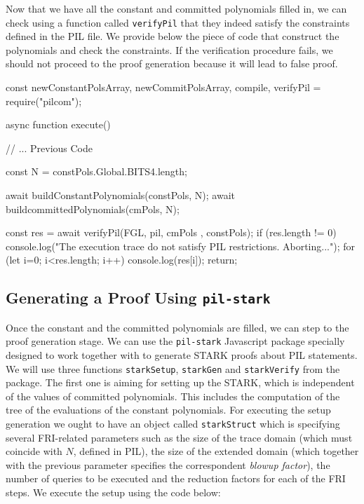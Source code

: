 Now that we have all the constant and committed polynomials filled in, we can check using a function called \texttt{verifyPil} that they indeed satisfy the constraints defined in the PIL file. We provide below the piece of code that construct the polynomials and check the constraints. If the verification procedure fails, we should not proceed to the proof generation because it will lead to false proof. 
\begin{js}
    const { newConstantPolsArray, newCommitPolsArray, compile, verifyPil } = require("pilcom");
    
    async function execute() {
        
        // ... Previous Code	
        
        const N = constPols.Global.BITS4.length;
        
        await buildConstantPolynomials(constPols, N);
        await buildcommittedPolynomials(cmPols, N);
        
        const res =  await verifyPil(FGL, pil, cmPols , constPols);
        if (res.length != 0) {
            console.log("The execution trace do not satisfy PIL restrictions. Aborting...");
            for (let i=0; i<res.length; i++) {
                console.log(res[i]);
                return;
            }
        }
    }
\end{js}







\subsection{Generating a Proof Using \texttt{pil-stark}}

Once the constant and the committed polynomials are filled, we can step to the proof generation stage. We can use the \texttt{pil-stark} Javascript package specially designed to work together with \pilcom to generate STARK proofs about PIL statements. We will use three functions \texttt{starkSetup}, \texttt{starkGen} and \texttt{starkVerify} from the package. The first one is aiming for setting up the STARK, which is independent of the values of committed polynomials. This includes the computation of the tree of the evaluations of the constant polynomials. For executing the setup generation we ought to have an object called \texttt{starkStruct} which is specifying several FRI-related parameters such as the size of the trace domain (which must coincide with $N$, defined in PIL), the size of the extended domain (which together with the previous parameter specifies the correspondent \textit{blowup factor}), the number of queries to be executed and the reduction factors for each of the FRI steps. We execute the setup using the code below:

